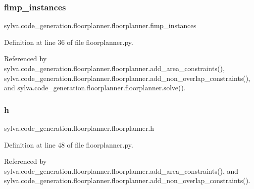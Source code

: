 \subsubsection{\texorpdfstring{fimp\+\_\+instances}{fimp\_instances}}
{\footnotesize\ttfamily sylva.\+code\+\_\+generation.\+floorplanner.\+floorplanner.\+fimp\+\_\+instances}



Definition at line 36 of file floorplanner.\+py.



Referenced by sylva.\+code\+\_\+generation.\+floorplanner.\+floorplanner.\+add\+\_\+area\+\_\+constraints(), sylva.\+code\+\_\+generation.\+floorplanner.\+floorplanner.\+add\+\_\+non\+\_\+overlap\+\_\+constraints(), and sylva.\+code\+\_\+generation.\+floorplanner.\+floorplanner.\+solve().

\mbox{\label{classsylva_1_1code__generation_1_1floorplanner_1_1floorplanner_ae267251903086826b4814d3a3358a40f}} 
\subsubsection{\texorpdfstring{h}{h}}
{\footnotesize\ttfamily sylva.\+code\+\_\+generation.\+floorplanner.\+floorplanner.\+h}



Definition at line 48 of file floorplanner.\+py.



Referenced by sylva.\+code\+\_\+generation.\+floorplanner.\+floorplanner.\+add\+\_\+area\+\_\+constraints(), and sylva.\+code\+\_\+generation.\+floorplanner.\+floorplanner.\+add\+\_\+non\+\_\+overlap\+\_\+constraints().

\mbox{\label{classsylva_1_1code__generation_1_1floorplanner_1_1floorplanner_a595a65d9ac2624c445577c600a1a2a59}} 

